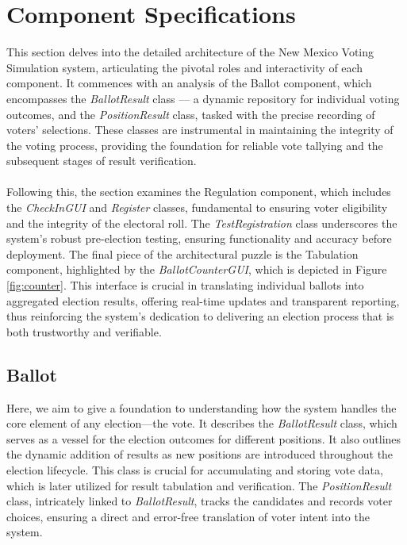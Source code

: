 \documentclass{article}
\begin{document}
\section{Component Specifications}
This section delves into the detailed architecture of the New Mexico Voting Simulation system, articulating the pivotal roles and interactivity of each component. It commences with an analysis of the Ballot component, which encompasses the \textit{BallotResult} class — a dynamic repository for individual voting outcomes, and the \textit{PositionResult} class, tasked with the precise recording of voters' selections. These classes are instrumental in maintaining the integrity of the voting process, providing the foundation for reliable vote tallying and the subsequent stages of result verification. \\ \\
Following this, the section examines the Regulation component, which includes the \textit{CheckInGUI} and \textit{Register} classes, fundamental to ensuring voter eligibility and the integrity of the electoral roll. The \textit{TestRegistration} class underscores the system's robust pre-election testing, ensuring functionality and accuracy before deployment. The final piece of the architectural puzzle is the Tabulation component, highlighted by the \textit{BallotCounterGUI}, which is depicted in Figure \ref{fig:counter}. This interface is crucial in translating individual ballots into aggregated election results, offering real-time updates and transparent reporting, thus reinforcing the system's dedication to delivering an election process that is both trustworthy and verifiable.

\subsection{Ballot}
Here, we aim to give a foundation to understanding how the system handles the core element of any election—the vote. It describes the \textit{BallotResult} class, which serves as a vessel for the election outcomes for different positions. It also outlines the dynamic addition of results as new positions are introduced throughout the election lifecycle. This class is crucial for accumulating and storing vote data, which is later utilized for result tabulation and verification. The \textit{PositionResult} class, intricately linked to \textit{BallotResult}, tracks the candidates and records voter choices, ensuring a direct and error-free translation of voter intent into the system.
\end{document}
